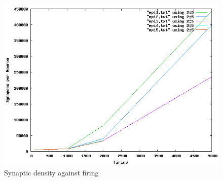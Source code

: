 \begin{figure}[h!]
\begin{center}
\includegraphics[scale = 0.5]{images/synapses_firing.png}
\end{center}
\caption{Synaptic density against firing}
\end{figure}



